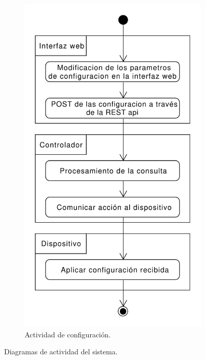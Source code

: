 \begin{figure}[!h]
\begin{subfigure}[b]{0.43\textwidth}
        \includegraphics[width=\textwidth]{Figures/actividad_config_web.pdf}
        \caption{Actividad de configuración.}
    \end{subfigure}
    \caption{Diagramas de actividad del sistema.}
    \label{fig:actividad_config}
\end{figure}

